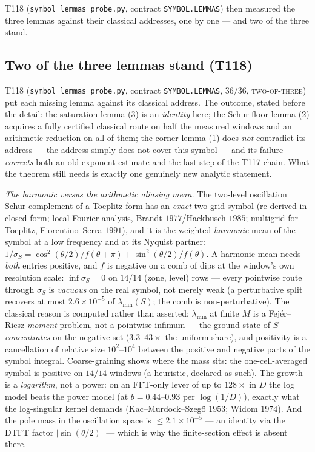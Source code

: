 \documentclass[11pt,a4paper]{article}
\begin{document}
\noindent T118 (\texttt{symbol\_lemmas\_probe.py}, contract \texttt{SYMBOL.LEMMAS}) then measured
the three lemmas against their classical addresses, one by one --- and two of the three stand.

\subsection{Two of the three lemmas stand (T118)}
T118 (\texttt{symbol\_lemmas\_probe.py}, contract \texttt{SYMBOL.LEMMAS}, $36/36$,
\textsc{two-of-three}) put each missing lemma against its classical address. The outcome, stated
before the detail: the saturation lemma (3) is an \emph{identity} here; the Schur-floor lemma
(2) acquires a fully certified classical route on half the measured windows and an arithmetic
reduction on all of them; the corner lemma (1) does \emph{not} contradict its address --- the
address simply does not cover this symbol --- and its failure \emph{corrects} both an old
exponent estimate and the last step of the T117 chain. What the theorem still needs is exactly
one genuinely new analytic statement.

\emph{The harmonic versus the arithmetic aliasing mean.} The two-level oscillation Schur
complement of a Toeplitz form has an \emph{exact} two-grid symbol (re-derived in closed form;
local Fourier analysis, Brandt $1977$/Hackbusch $1985$; multigrid for Toeplitz,
Fiorentino--Serra $1991$), and it is the weighted \emph{harmonic} mean of the symbol at a low
frequency and at its Nyquist partner:
$1/\sigma_S=\cos^2(\theta/2)/f(\theta+\pi)+\sin^2(\theta/2)/f(\theta)$. A harmonic mean needs
\emph{both} entries positive, and $f$ is negative on a comb of dips at the window's own
resolution scale: $\inf\sigma_S=0$ on $14/14$ (zone, level) rows --- every pointwise route
through $\sigma_S$ is \emph{vacuous} on the real symbol, not merely weak (a perturbative split
recovers at most $2.6\times10^{-5}$ of $\lambda_{\min}(S)$; the comb is non-perturbative). The
classical reason is computed rather than asserted: $\lambda_{\min}$ at finite $M$ is a
Fej\'er--Riesz \emph{moment} problem, not a pointwise infimum --- the ground state of $S$
\emph{concentrates} on the negative set ($3.3$--$43\times$ the uniform share), and positivity
is a cancellation of relative size $10^2$--$10^4$ between the positive and negative parts of
the symbol integral. Coarse-graining shows where the mass sits: the one-cell-averaged symbol is
positive on $14/14$ windows (a heuristic, declared as such). The growth is a \emph{logarithm},
not a power: on an FFT-only lever of up to $128\times$ in $D$ the log model beats the power
model (at $b=0.44$--$0.93$ per $\log(1/D)$), exactly what the log-singular kernel demands
(Kac--Murdock--Szeg\H{o} $1953$; Widom $1974$). And the pole mass in the oscillation space is
$\le2.1\times10^{-5}$ --- an identity via the DTFT factor $|\sin(\theta/2)|$ --- which is why
the finite-section effect is absent there.
\end{document}
